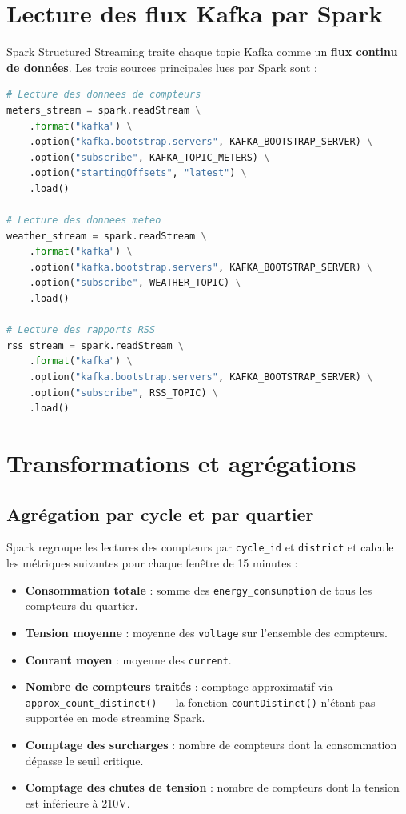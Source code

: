 \documentclass[12pt,a4paper]{report}
\begin{document}
\section{Lecture des flux Kafka par Spark}

Spark Structured Streaming traite chaque topic Kafka comme un \textbf{flux continu de données}.
Les trois sources principales lues par Spark sont :

\begin{lstlisting}[language=python, caption={Lecture des topics Kafka par Spark Structured Streaming}]
# Lecture des donnees de compteurs
meters_stream = spark.readStream \
    .format("kafka") \
    .option("kafka.bootstrap.servers", KAFKA_BOOTSTRAP_SERVER) \
    .option("subscribe", KAFKA_TOPIC_METERS) \
    .option("startingOffsets", "latest") \
    .load()

# Lecture des donnees meteo
weather_stream = spark.readStream \
    .format("kafka") \
    .option("kafka.bootstrap.servers", KAFKA_BOOTSTRAP_SERVER) \
    .option("subscribe", WEATHER_TOPIC) \
    .load()

# Lecture des rapports RSS
rss_stream = spark.readStream \
    .format("kafka") \
    .option("kafka.bootstrap.servers", KAFKA_BOOTSTRAP_SERVER) \
    .option("subscribe", RSS_TOPIC) \
    .load()
\end{lstlisting}

\section{Transformations et agrégations}

\subsection{Agrégation par cycle et par quartier}

Spark regroupe les lectures des compteurs par \texttt{cycle\_id} et \texttt{district}
et calcule les métriques suivantes pour chaque fenêtre de 15 minutes :

\begin{itemize}
    \item \textbf{Consommation totale} : somme des \texttt{energy\_consumption} de tous
    les compteurs du quartier.
    \item \textbf{Tension moyenne} : moyenne des \texttt{voltage} sur l'ensemble des compteurs.
    \item \textbf{Courant moyen} : moyenne des \texttt{current}.
    \item \textbf{Nombre de compteurs traités} : comptage approximatif via
    \texttt{approx\_count\_distinct()} — la fonction \texttt{countDistinct()} n'étant
    pas supportée en mode streaming Spark.
    \item \textbf{Comptage des surcharges} : nombre de compteurs dont la consommation
    dépasse le seuil critique.
    \item \textbf{Comptage des chutes de tension} : nombre de compteurs dont la tension
    est inférieure à 210V.
\end{itemize}
\end{document}
